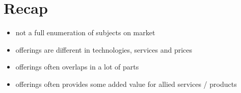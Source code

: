 \documentclass[11pt]{article}
\begin{document}
\section*{Recap}
\label{sec:orgfdf4b62}
\begin{itemize}
\item not a full enumeration of subjects on market
\item offerings are different in technologies, services and prices
\item offerings often overlaps in a lot of parts
\item offerings often provides some added value for allied services / products
\end{itemize}
\end{document}
